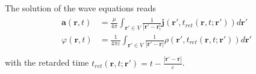 \documentclass[letterpaper,10pt,english]{jupyterBook}
\begin{document}
\sphinxAtStartPar
The solution of the wave equations reads
\begin{equation*}
\begin{split}\begin{aligned}
  \mathbf{a}(\mathbf{r},t) & = \frac{\mu}{4 \pi} \int_{\mathbf{r}' \in V} \frac{1}{| \mathbf{r}' - \mathbf{r} |} \mathbf{j} \left( \mathbf{r}', t_{ret}(\mathbf{r}, t; \mathbf{r}') \right)  d \mathbf{r}' \\
  \varphi(\mathbf{r},t) & = \frac{1}{4 \pi \varepsilon} \int_{\mathbf{r}' \in V} \frac{1}{| \mathbf{r}' - \mathbf{r} |} \rho \left( \mathbf{r}', t_{ret}(\mathbf{r}, t; \mathbf{r}') \right)  d \mathbf{r}' \\
\end{aligned}\end{split}
\end{equation*}
\sphinxAtStartPar
with the retarded time \(t_{ret}(\mathbf{r}, t; \mathbf{r}') = t - \frac{| \mathbf{r}' - \mathbf{r} |}{c} \).
\end{document}
